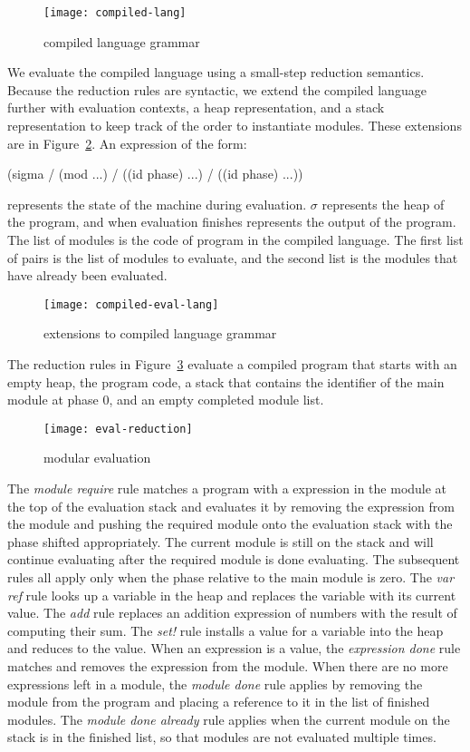 \documentclass[ms,electronic,letterpaper,lol,lof,lot]{byumsphd}
\begin{document}
\begin{figure}[h]
\texttt{[image: compiled-lang]}
\caption{compiled language grammar}
\label{compiled-lang}
\end{figure}

We evaluate the compiled language using a small-step reduction semantics. 
Because the reduction rules are syntactic, we extend the compiled language further with evaluation contexts, a heap representation, and a stack representation to keep track of the order to instantiate modules.
These extensions are in Figure~\ref{compiled-eval-lang}.
An expression of the form:
\begin{schemedisplay}
(sigma / (mod ...) / ((id phase) ...)  / ((id phase) ...))
\end{schemedisplay}
represents the state of the machine during evaluation.
$\sigma$ represents the heap of the program, and when evaluation finishes represents the output of the program.
The list of modules is the code of program in the compiled language.
The first list of  pairs is the list of modules to evaluate, and the second list is the modules that have already been evaluated.

\begin{figure}[h]
\texttt{[image: compiled-eval-lang]}
\caption{extensions to compiled language grammar}
\label{compiled-eval-lang}
\end{figure}

The reduction rules in Figure~\ref{eval-reduction} evaluate a compiled program that starts with an empty heap, the program code, a stack that contains the identifier of the main module at phase 0, and an empty completed module list. 

\begin{figure}[h]
\texttt{[image: eval-reduction]}
\caption{modular evaluation}
\label{eval-reduction}
\end{figure}

The \emph{module require} rule matches a program with a  expression in the module at the top of the evaluation stack and evaluates it by removing the  expression from the module and pushing the required module onto the evaluation stack with the phase shifted appropriately.
The current module is still on the stack and will continue evaluating after the required module is done evaluating.
The subsequent rules all apply only when the phase relative to the main module is zero.
The \emph{var ref} rule looks up a variable in the heap and replaces the variable with its current value.
The \emph{add} rule replaces an addition expression of numbers with the result of computing their sum.
The \emph{set!} rule installs a value for a variable into the heap and reduces to the value.
When an expression is a value, the \emph{expression done} rule matches and removes the expression from the module.
When there are no more expressions left in a module, the \emph{module done} rule applies by removing the module from the program and placing a reference to it in the list of finished modules.
The \emph{module done already} rule applies when the current module on the stack is in the finished list, so that modules are not evaluated multiple times. 
\end{document}
